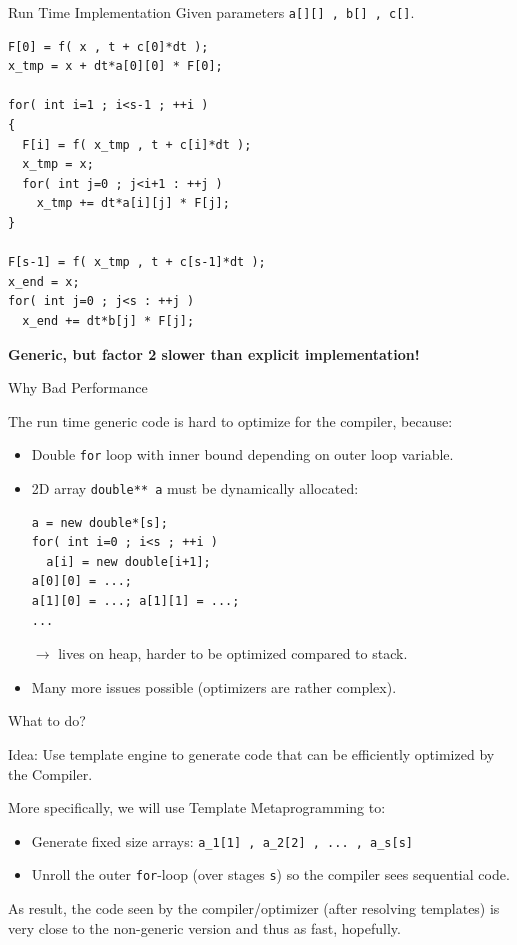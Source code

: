 \documentclass{beamer}
\begin{document}
\begin{frame}[fragile]{Run Time Implementation}
Given parameters \lstinline+a[][] , b[] , c[]+.
\begin{lstlisting}
F[0] = f( x , t + c[0]*dt );
x_tmp = x + dt*a[0][0] * F[0];

for( int i=1 ; i<s-1 ; ++i )
{
  F[i] = f( x_tmp , t + c[i]*dt );
  x_tmp = x;
  for( int j=0 ; j<i+1 : ++j )
    x_tmp += dt*a[i][j] * F[j];
}

F[s-1] = f( x_tmp , t + c[s-1]*dt );
x_end = x;
for( int j=0 ; j<s : ++j )
  x_end += dt*b[j] * F[j];
\end{lstlisting}

\pause
\textbf{Generic, but factor 2 slower than explicit implementation!}
\end{frame}


\begin{frame}[fragile]{Why Bad Performance}

The run time generic code is hard to optimize for the compiler, because:

\begin{itemize}
 \item Double \lstinline+for+ loop with inner bound depending on outer loop variable.
 \item 2D array \lstinline+double** a+ must be dynamically allocated:
\begin{lstlisting}
a = new double*[s];
for( int i=0 ; i<s ; ++i )
  a[i] = new double[i+1];
a[0][0] = ...; 
a[1][0] = ...; a[1][1] = ...; 
...
\end{lstlisting}
$\longrightarrow$ lives on heap, harder to be optimized compared to stack.
 \item Many more issues possible (optimizers are rather complex).

\end{itemize}

\end{frame}

\begin{frame}{What to do?}

\begin{block}{Idea:}
 Use template engine to generate code that can be efficiently optimized by the Compiler.
\end{block}

\vspace{1em}
\pause
More specifically, we will use Template Metaprogramming to:
\begin{itemize}
 \item Generate fixed size arrays: \lstinline+a_1[1] , a_2[2] , ... , a_s[s]+
 \item Unroll the outer \lstinline+for+-loop (over stages \lstinline+s+) so the compiler sees sequential code.
\end{itemize}

As result, the code seen by the compiler/optimizer (after resolving templates) is very close to the non-generic version and thus as fast, hopefully.
\end{frame}
\end{document}
